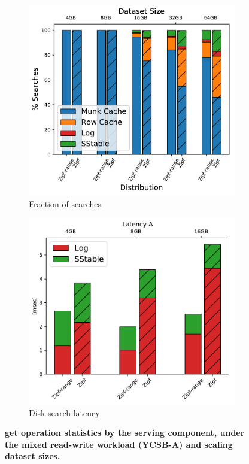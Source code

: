 \begin{figure}
\centering
\hspace{0.05\linewidth}
\begin{subfigure}{0.3\linewidth}
\includegraphics[width=\textwidth]{figs/Time_percentage_A.pdf}
\caption{Fraction of searches}
\label{fig:readstat:dist}
\end{subfigure}
\hspace{0.05\linewidth}
\begin{subfigure}{0.3\linewidth}
\includegraphics[width=\textwidth]{figs/Latency_A.pdf}
\caption{Disk search latency}
\label{fig:readstat:lat}
\end{subfigure}
\caption{\bf{\sys\/ get operation statistics by the serving component, under the mixed read-write workload (YCSB-A) and scaling dataset sizes.}}
\label{fig:readstat}
\end{figure}

